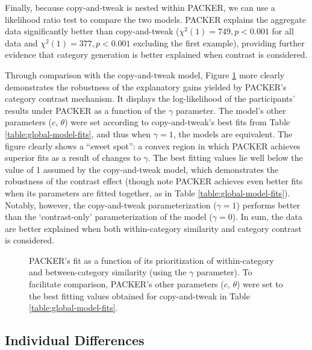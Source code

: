 \documentclass[12pt]{article}
\newcommand\inputpgf[2]{{
\let\pgfimageWithoutPath\pgfimage
\renewcommand{\pgfimage}[2][]{\pgfimageWithoutPath[##1]{#1/##2}}

}}
\begin{document}
\begin{flushleft}
Finally, because copy-and-tweak is nested within PACKER, we can use a likelihood ratio test to compare the two models. PACKER explains the aggregate data significantly better than copy-and-tweak ($\chi^2(1) = 749, p < 0.001$ for all data and $\chi^2(1) = 377, p < 0.001$ excluding the first example), providing further evidence that category generation is better explained when contrast is considered.

Through comparison with the copy-and-tweak model, Figure \ref{fig:packer-loglike} more clearly demonstrates the robustness of the explanatory gains yielded by PACKER's category contrast mechanism. It displays the log-likelihood of the participants' results under PACKER as a function of the $\gamma$ parameter. The model's other parameters ($c$, $\theta$) were set according to copy-and-tweak's best fits from Table \ref{table:global-model-fits}, and thus when $\gamma=1$, the models are equivalent. The figure clearly shows a ``sweet spot'':  a convex region in which PACKER achieves superior fits as a result of changes to $\gamma$. The best fitting values lie well below the value of 1 assumed by the copy-and-tweak model, which demonstrates the robustness of the contrast effect (though note PACKER achieves even better fits when its parameters are fitted together, as in Table \ref{table:global-model-fits}). Notably, however, the copy-and-tweak parameterization ($\gamma=1$) performs better than the `contrast-only' parameterization of the model ($\gamma = 0$). In sum, the data are better explained when both within-category similarity and category contrast is considered.

\begin{figure}
    \begin{center}
    \inputpgf{figs/}{packer-loglike.pgf}
    \caption{PACKER's fit as a function of its prioritization of within-category and between-category similarity (using the $\gamma$ parameter). To facilitate comparison, PACKER's other parameters ($c$, $\theta$) were set to the best fitting values obtained for copy-and-tweak in Table \ref{table:global-model-fits}. }
    \label{fig:packer-loglike}
    \end{center}
\end{figure}


\subsection{Individual Differences}
\label{section:individual-diffs}


\end{flushleft}
\end{document}
